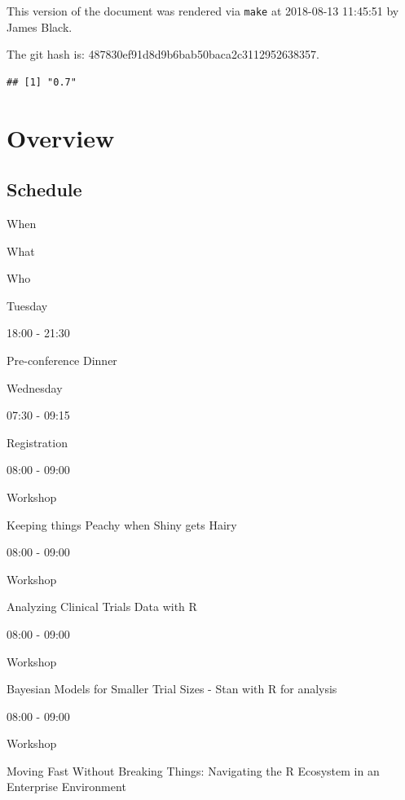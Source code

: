 \documentclass[]{book}
\makeatletter
\newenvironment{Shaded}{\begin{snugshade}}{\end{snugshade}}
\newcommand{\KeywordTok}[1]{\textcolor[rgb]{0.13,0.29,0.53}{\textbf{#1}}}
\newcommand{\NormalTok}[1]{#1}
\newcommand{\OperatorTok}[1]{\textcolor[rgb]{0.81,0.36,0.00}{\textbf{#1}}}
\newcommand{\StringTok}[1]{\textcolor[rgb]{0.31,0.60,0.02}{#1}}
\newenvironment{kframe}{%
\medskip{}
\setlength{\fboxsep}{.8em}
 \def\at@end@of@kframe{}%
 \ifinner\ifhmode%
  \def\at@end@of@kframe{\end{minipage}}%
  \begin{minipage}{\columnwidth}%
 \fi\fi%
 \def\FrameCommand##1{\hskip\@totalleftmargin \hskip-\fboxsep
 \colorbox{shadecolor}{##1}\hskip-\fboxsep
     \hskip-\linewidth \hskip-\@totalleftmargin \hskip\columnwidth}%
 \MakeFramed {\advance\hsize-\width
   \@totalleftmargin\z@ \linewidth\hsize
   \@setminipage}}%
 {\par\unskip\endMakeFramed%
 \at@end@of@kframe}
\renewenvironment{Shaded}{\begin{kframe}}{\end{kframe}}
\theoremstyle{definition}
\theoremstyle{definition}
\theoremstyle{definition}
\theoremstyle{remark}
\makeatother
\begin{document}
This version of the document was rendered via \texttt{make} at
2018-08-13 11:45:51 by James Black.

The git hash is: 487830ef91d8d9b6bab50baca2c3112952638357.

\begin{Shaded}
\end{Shaded}

\begin{verbatim}
## [1] "0.7"
\end{verbatim}

\hypertarget{part-overview}{%
\part{Overview}\label{part-overview}}

\hypertarget{schedule}{%
\chapter{Schedule}\label{schedule}}

When

What

Who

Tuesday

18:00 - 21:30

Pre-conference Dinner

Wednesday

07:30 - 09:15

Registration

08:00 - 09:00

Workshop

Keeping things Peachy when Shiny gets Hairy

08:00 - 09:00

Workshop

Analyzing Clinical Trials Data with R

08:00 - 09:00

Workshop

Bayesian Models for Smaller Trial Sizes - Stan with R for analysis

08:00 - 09:00

Workshop

Moving Fast Without Breaking Things: Navigating the R Ecosystem in an
Enterprise Environment
\end{document}
